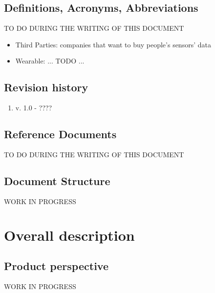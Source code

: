 \documentclass{report}
\begin{document}
		\section{Definitions, Acronyms, Abbreviations}
		TO DO DURING THE WRITING OF THIS DOCUMENT
		\begin{itemize}
		\item Third Parties: companies that want to buy people's sensors' data
		\item Wearable: ... TODO ...
		\end{itemize}
		\section{Revision history}
		\begin{enumerate}
			\item v. 1.0 - ????
		\end{enumerate}
		\section{Reference Documents}
		TO DO DURING THE WRITING OF THIS DOCUMENT
		\section{Document Structure}
		WORK IN PROGRESS
	\chapter{Overall description}
		\section{Product perspective}
			WORK IN PROGRESS
\end{document}

